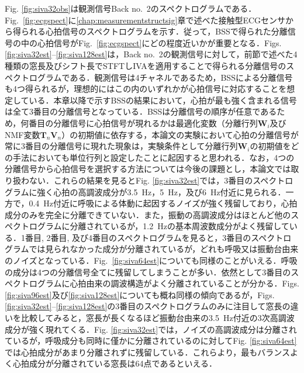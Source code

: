 Fig. \ref{fig:siva32obs}は観測信号Back no.~2のスペクトログラムである．Fig.~\ref{fig:ecgspect}に\ref{chap:measurementstructsig}章で述べた接触型ECGセンサから得られる心拍信号のスペクトログラムを示す．従って，BSSで得られた分離信号の中の心拍信号がFig.~\ref{fig:ecgspect}にどの程度近いかが重要となる．Figs. \ref{fig:siva32est}--\ref{fig:siva128est}は，Back no.~2の観測信号に対して，前節で述べた4種類の窓長及びシフト長でSTFTしIVAを適用することで得られる分離信号のスペクトログラムである．観測信号は4チャネルであるため，BSSによる分離信号も4つ得られるが，理想的にはこの内のいずれかが心拍信号に対応することを想定している．本章以降で示すBSSの結果において，心拍が最も強く含まれる信号は全て3番目の分離信号となっている．BSSは分離信号の順序が任意であるため，何番目の分離信号に心拍信号が現れるかは最適化変数（分離行列$\bm{W}_i$及びNMF変数$\bm{T}_n\bm{V}_n$）の初期値に依存する，本論文の実験において心拍の分離信号が常に3番目の分離信号に現れた現象は，実験条件として分離行列$\bm{W}_i$の初期値をどの手法においても単位行列と設定したことに起因すると思われる．なお，4つの分離信号から心拍信号を選択する方法については今後の課題とし，本論文では取り扱わない．これらの結果を見るとFig. \ref{fig:siva32est}では，3番目のスペクトログラムに強く心拍の高調波成分が3.5~Hz，5~Hz，及び6~Hz付近に見られる．一方で，0.4~Hz付近に呼吸による体動に起因するノイズが強く残留しており，心拍成分のみを完全に分離できていない．また，振動の高調波成分はほとんど他のスペクトログラムに分離されているが，1.2~Hzの基本周波数成分がよく残留している．1番目, 2番目, 及び4番目のスペクトログラムを見ると，3番目のスペクトログラムでは見られなかった成分が分離されているが，どれも呼吸又は振動台由来のノイズとなっている．Fig.~\ref{fig:siva64est}についても同様のことがいえる．呼吸の成分は4つの分離信号全てに残留してしまうことが多い．依然として3番目のスペクトログラムに心拍由来の調波構造がよく分離されていることが分かる．Figs. \ref{fig:siva96est}及び\ref{fig:siva128est}についても概ね同様の傾向であるが，Figs. \ref{fig:siva32est}--\ref{fig:siva128est}の3番目のスペクトログラムのみに注目して窓長の違いを比較してみると，窓長が長くなるほど振動台由来の3.5~Hz付近の3次高調波成分が強く現れてくる．Fig. \ref{fig:siva32est}では，ノイズの高調波成分は分離されているが，呼吸成分も同時に僅かに分離されているのに対してFig. \ref{fig:siva64est}では心拍成分があまり分離されずに残留している．これらより，最もバランスよく心拍成分が分離されている窓長は64点であるといえる．

